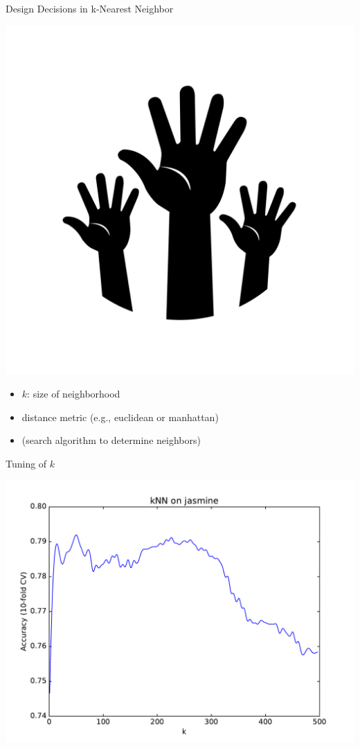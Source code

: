 \begin{frame}[c]{Design Decisions in k-Nearest Neighbor}

\includegraphics[scale=0.05]{images/hands}
\pause

\begin{itemize}
  \item $k$: size of neighborhood
  \item distance metric (e.g., euclidean or manhattan)
  \item (search algorithm to determine neighbors)
\end{itemize}

\end{frame}
\begin{frame}[c]{Tuning of $k$}

\centering
\includegraphics[scale=.5]{images/kNN-jasmine}

\end{frame}
